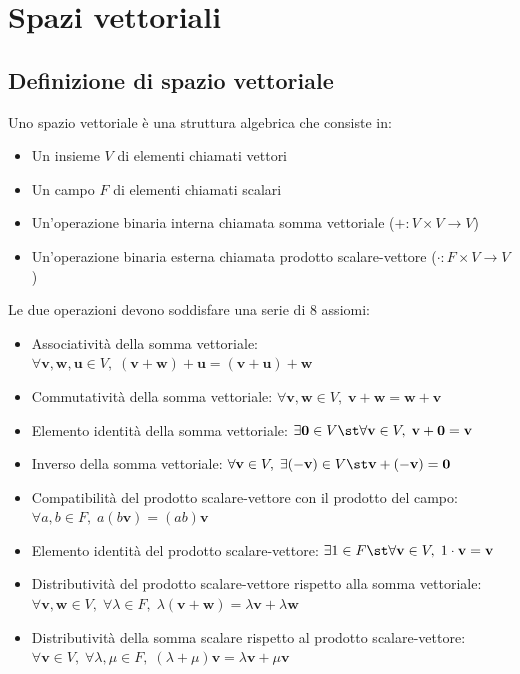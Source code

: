 
\section{Spazi vettoriali} \label{sec:vectorspaces}
\subsection{Definizione di spazio vettoriale} \label{subsec:vsdefiniton}
    Uno spazio vettoriale è una struttura algebrica che consiste in:
    \begin{itemize}
        \item Un insieme $V$ di elementi chiamati vettori
        \item Un campo $F$ di elementi chiamati scalari
        \item Un'operazione binaria interna chiamata somma vettoriale ($+ : V \times V \rightarrow V$)
        \item Un'operazione binaria esterna chiamata prodotto scalare-vettore ($\cdot : F \times V \rightarrow V$)
    \end{itemize}

    \vspace{10pt}
    Le due operazioni devono soddisfare una serie di 8 assiomi:
    \begin{itemize}
        \item Associatività della somma vettoriale: $ \forall \mathbf{v},\mathbf{w},\mathbf{u} \in V, \; (\mathbf{v} + \mathbf{w}) + \mathbf{u} = (\mathbf{v} + \mathbf{u}) + \mathbf{w} $
        \item Commutatività della somma vettoriale: $ \forall \mathbf{v},\mathbf{w} \in V, \; \mathbf{v} + \mathbf{w} = \mathbf{w} + \mathbf{v} $
        \item Elemento identità della somma vettoriale: $ \exists \mathbf{0} \in V \st \forall \mathbf{v} \in V,  \; \mathbf{v} + \mathbf{0} = \mathbf{v} $
        \item Inverso della somma vettoriale: $ \forall \mathbf{v} \in V, \; \exists (-\mathbf{v}) \in V \st \mathbf{v} + (-\mathbf{v}) = \mathbf{0} $
        \item Compatibilità del prodotto scalare-vettore con il prodotto del campo: $ \forall a, b \in F, \;  a(b\mathbf{v}) = (ab)\mathbf{v} $
        \item Elemento identità del prodotto scalare-vettore: $ \exists 1 \in F \st \forall \mathbf{v} \in V, \; 1 \cdot \mathbf{v} = \mathbf{v} $
        \item Distributività del prodotto scalare-vettore rispetto alla somma vettoriale: $ \forall \mathbf{v}, \mathbf{w} \in V, \; \forall \lambda \in F, \; \lambda(\mathbf{v} + \mathbf{w}) = \lambda\mathbf{v} + \lambda\mathbf{w}$
        \item Distributività della somma scalare rispetto al prodotto scalare-vettore: $ \forall \mathbf{v} \in V, \; \forall \lambda,\mu \in F, \; (\lambda + \mu)\mathbf{v} = \lambda\mathbf{v} + \mu\mathbf{v} $
    \end{itemize}



